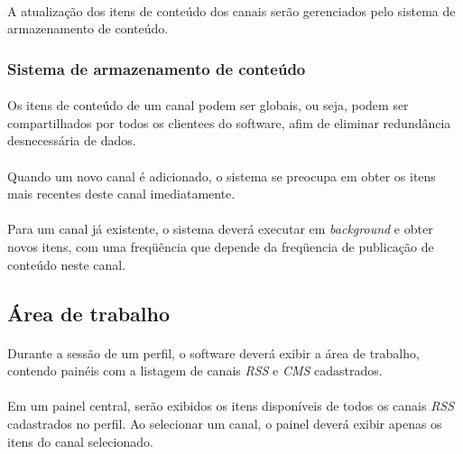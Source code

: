 \documentclass[a4paper,12pt]{article}
\def\cms{\emph{CMS}}
\def\rss{\emph{RSS}}
\begin{document}
\paragraph{}
A atualização dos itens de conteúdo dos canais serão gerenciados pelo sistema de armazenamento de conteúdo.
\paragraph{}

\subsubsection{Sistema de armazenamento de conteúdo}

\paragraph{}
Os itens de conteúdo de um canal podem ser globais, ou seja, podem ser compartilhados por todos os clientees do software, afim de eliminar redundância desnecessária de dados.
\paragraph{}
Quando um novo canal é adicionado, o sistema se preocupa em obter os itens mais recentes deste canal imediatamente.
\paragraph{}
Para um canal já existente, o sistema deverá executar em \emph{background} e obter novos itens, com uma freqüência que depende da freqüencia de publicação de conteúdo neste canal.

\subsection{Área de trabalho}

\paragraph{}
Durante a sessão de um perfil, o software deverá exibir a área de trabalho, contendo painéis com a listagem de canais \rss{} e \cms{} cadastrados.
\paragraph{}
Em um painel central, serão exibidos os itens disponíveis de todos os canais \rss{} cadastrados no perfil. Ao selecionar um canal, o painel deverá exibir apenas os itens do canal selecionado.
\end{document}
